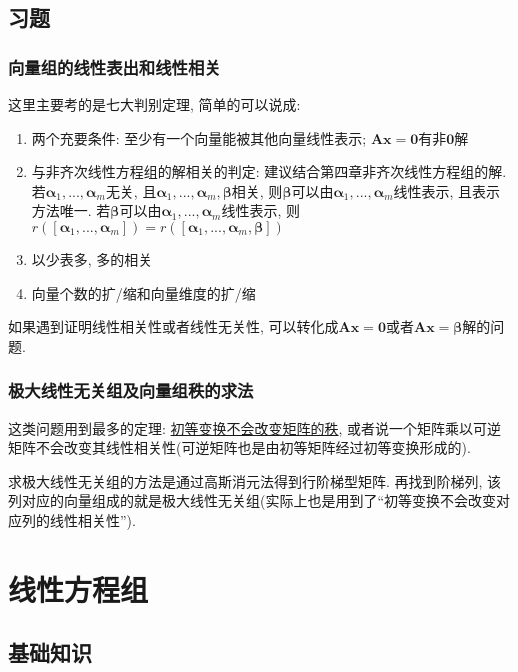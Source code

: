 \section{习题}
\subsection{向量组的线性表出和线性相关}
这里主要考的是七大判别定理, 简单的可以说成:
\begin{enumerate}
\item 两个充要条件: 至少有一个向量能被其他向量线性表示; $ \bm{A}\bm{x}=\bm{0} $有非$ \bm{0} $解
\item 与非齐次线性方程组的解相关的判定: 建议结合第四章非齐次线性方程组的解. 若$ \bm{\alpha}_{1},...,\bm{\alpha}_{m} $无关, 且$ \bm{\alpha}_{1},...,\bm{\alpha}_{m},\bm{\beta} $相关, 则$ \bm{\beta} $可以由$ \bm{\alpha}_{1},...,\bm{\alpha}_{m} $线性表示, 且表示方法唯一. 若$ \bm{\beta} $可以由$ \bm{\alpha}_{1},...,\bm{\alpha}_{m} $线性表示, 则$ r([\bm{\alpha}_{1},...,\bm{\alpha}_{m}])=r([\bm{\alpha}_{1},...,\bm{\alpha}_{m},\bm{\beta}]) $
\item 以少表多, 多的相关
\item 向量个数的扩/缩和向量维度的扩/缩
\end{enumerate}\par 
如果遇到证明线性相关性或者线性无关性, 可以转化成$ \bm{A}\bm{x}=\bm{0} $或者$ \bm{A}\bm{x}=\bm{\beta} $解的问题.
\subsection{极大线性无关组及向量组秩的求法}
这类问题用到最多的定理: \hyperref[初等变换不会改变矩阵的秩]{初等变换不会改变矩阵的秩}, 或者说一个矩阵乘以可逆矩阵不会改变其线性相关性(可逆矩阵也是由初等矩阵经过初等变换形成的). \par \vspace{.5em}求极大线性无关组的方法是通过高斯消元法得到行阶梯型矩阵. 再找到阶梯列, 该列对应的向量组成的就是极大线性无关组(实际上也是用到了``初等变换不会改变对应列的线性相关性'').
\chapter{线性方程组}
\section{基础知识}
